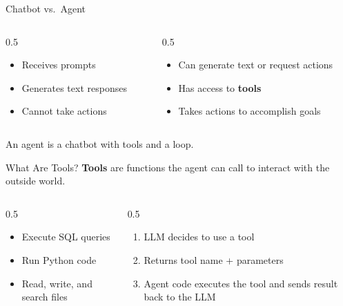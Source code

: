 \documentclass[aspectratio=169]{beamer}
\begin{document}
\begin{frame}{Chatbot vs.\ Agent}
\begin{columns}[T]
\begin{column}{0.5\textwidth}
\begin{shadedbox}[title=\textbf{Chatbot}]
\begin{itemize}\small
  \item Receives prompts
  \item Generates text responses
  \item Cannot take actions
\end{itemize}
\end{shadedbox}
\end{column}
\begin{column}{0.5\textwidth}
\begin{shadedbox}[title=\textbf{Agent}]
\begin{itemize}\small
  \item Can generate text \alert{or} request actions
  \item Has access to \textbf{tools}
  \item Takes actions to accomplish goals
\end{itemize}
\end{shadedbox}
\end{column}
\end{columns}
\vspace{0.5cm}
\begin{center}
\alert{An agent is a chatbot with tools and a loop.}
\end{center}
\end{frame}

\begin{frame}{What Are Tools?}
\textbf{Tools} are functions the agent can call to interact with the outside world.
\vspace{0.3cm}
\begin{columns}[T]
\begin{column}{0.5\textwidth}
\begin{shadedbox}[title=\textbf{Example Tools}]
\begin{itemize}\small
  \item Execute SQL queries
  \item Run Python code
  \item Read, write, and search files
\end{itemize}
\end{shadedbox}
\end{column}
\begin{column}{0.5\textwidth}
\begin{shadedbox}[title=\textbf{How Tools Work}]
\begin{enumerate}\small
  \item LLM decides to use a tool
  \item Returns tool name + parameters
  \item Agent code executes the tool and sends result back to the LLM
\end{enumerate}
\end{shadedbox}
\end{column}
\end{columns}
\end{frame}
\end{document}
